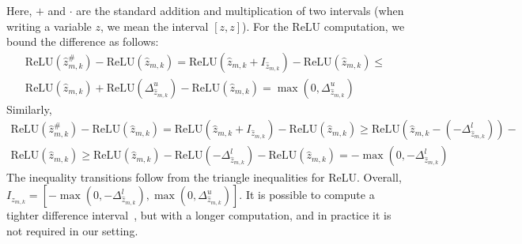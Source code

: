 Here, $+$ and $\cdot$ are the standard addition and multiplication of two intervals (when writing a variable $z$, we mean the interval $[z,z]$).  
     For the ReLU computation, we bound the difference as follows:
%
\begin{align*}
\text{ReLU}(\hat{z}^\#_{m,k}) - \text{ReLU}(\hat{z}_{m,k})=
\text{ReLU}(\hat{z}_{m,k} + I_{\hat{z}_{m,k}})- \text{ReLU}(\hat{z}_{m,k})\leq \\
\text{ReLU}(\hat{z}_{m,k}) + \text{ReLU}(\Delta^u_{\hat{z}_{m,k}})- \text{ReLU}(\hat{z}_{m,k})=\max(0,\Delta^u_{\hat{z}_{m,k}})
\end{align*}
Similarly, 
\begin{align*}
\text{ReLU}(\hat{z}^\#_{m,k}) - \text{ReLU}(\hat{z}_{m,k})=
\text{ReLU}(\hat{z}_{m,k} + I_{\hat{z}_{m,k}})- \text{ReLU}(\hat{z}_{m,k})\geq 
 \text{ReLU}(\hat{z}_{m,k} - (-\Delta^l_{\hat{z}_{m,k}}) )- \\ \text{ReLU}(\hat{z}_{m,k}) \geq
 \text{ReLU}(\hat{z}_{m,k}) - \text{ReLU}(-\Delta^l_{\hat{z}_{m,k}})- \text{ReLU}(\hat{z}_{m,k})=
  -\max(0,-\Delta^l_{\hat{z}_{m,k}})
\end{align*}
The inequality transitions follow from the triangle inequalities for ReLU.
Overall,
$I_{z_{m,k}}=[-\max(0,-\Delta^l_{\hat{z}_{m,k}}),\max(0,\Delta^u_{\hat{z}_{m,k}})]$. 
It is possible to compute a tighter difference interval~\cite{ref_1,ref_2}, but with a longer computation, and in practice it is not required in our setting. %


